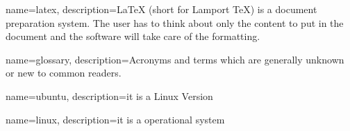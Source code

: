 {
	name=latex,
	description={LaTeX (short for Lamport TeX) is a document preparation system. The user has to think about only the content to put in the document and the software will take care of the formatting. }
}

{
	name=glossary,
	description={Acronyms and terms which are generally unknown or new to common readers.}
}

{
	name=ubuntu,
	description={it is a Linux Version}
}


{
	name=linux,
	description={it is a operational system}
}



